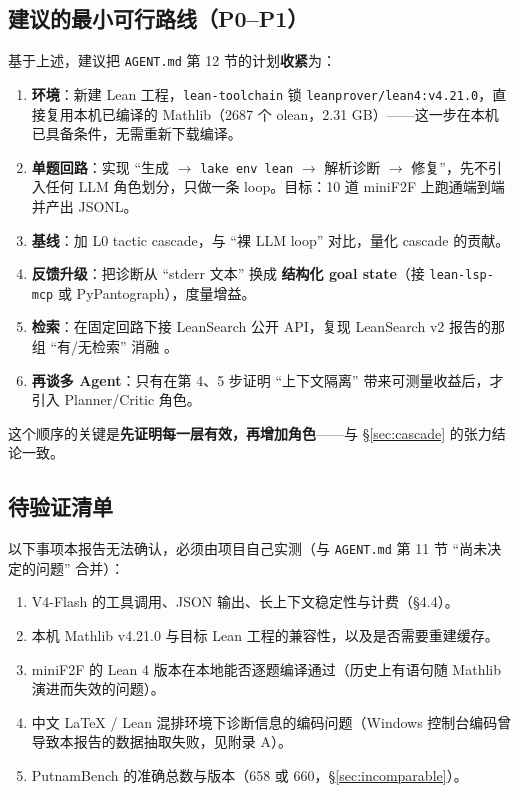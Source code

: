 \documentclass[UTF8,a4paper,11pt,fontset=windows]{ctexart}
\newcommand{\code}[1]{\texttt{#1}}
\begin{document}
\subsection{建议的最小可行路线（P0--P1）}

基于上述，建议把 \code{AGENT.md} 第 12 节的计划\textbf{收紧}为：

\begin{enumerate}
  \item \textbf{环境}：新建 Lean 工程，\code{lean-toolchain} 锁 \code{leanprover/lean4:v4.21.0}，直接复用本机已编译的 Mathlib（2687 个 olean，2.31 GB）——这一步在本机已具备条件，无需重新下载编译。
  \item \textbf{单题回路}：实现 ``生成 $\rightarrow$ \code{lake env lean} $\rightarrow$ 解析诊断 $\rightarrow$ 修复''，先不引入任何 LLM 角色划分，只做一条 loop。目标：10 道 miniF2F 上跑通端到端并产出 JSONL。
  \item \textbf{基线}：加 L0 tactic cascade，与 ``裸 LLM loop'' 对比，量化 cascade 的贡献。
  \item \textbf{反馈升级}：把诊断从 ``stderr 文本'' 换成 \textbf{结构化 goal state}（接 \code{lean-lsp-mcp} 或 PyPantograph）\cite{pantograph}，度量增益。
  \item \textbf{检索}：在固定回路下接 LeanSearch 公开 API，复现 LeanSearch v2 报告的那组 ``有/无检索'' 消融 \cite{leansearchv2}。
  \item \textbf{再谈多 Agent}：只有在第 4、5 步证明 ``上下文隔离'' 带来可测量收益后，才引入 Planner/Critic 角色。
\end{enumerate}

这个顺序的关键是\textbf{先证明每一层有效，再增加角色}——与 \S\ref{sec:cascade} 的张力结论一致。

\subsection{待验证清单}

以下事项本报告无法确认，必须由项目自己实测（与 \code{AGENT.md} 第 11 节 ``尚未决定的问题'' 合并）：

\begin{enumerate}
  \item V4-Flash 的工具调用、JSON 输出、长上下文稳定性与计费（\S4.4）。
  \item 本机 Mathlib v4.21.0 与目标 Lean 工程的兼容性，以及是否需要重建缓存。
  \item miniF2F 的 Lean 4 版本在本地能否逐题编译通过（历史上有语句随 Mathlib 演进而失效的问题）。
  \item 中文 LaTeX / Lean 混排环境下诊断信息的编码问题（Windows 控制台编码曾导致本报告的数据抽取失败，见附录 A）。
  \item PutnamBench 的准确总数与版本（658 或 660，\S\ref{sec:incomparable}）。
\end{enumerate}
\end{document}
